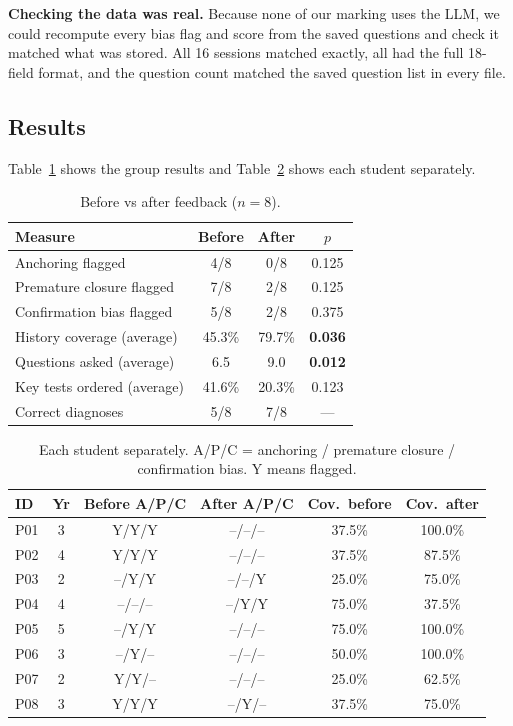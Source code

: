 \documentclass[conference]{IEEEtran}
\begin{document}
\textbf{Checking the data was real.} Because none of our marking uses the LLM,
we could recompute every bias flag and score from the saved questions and check
it matched what was stored. All 16 sessions matched exactly, all had the full
18-field format, and the question count matched the saved question list in every
file.

\subsection{Results}
Table~\ref{tab:pilot} shows the group results and Table~\ref{tab:perpart} shows
each student separately.

\begin{table}[t]
\caption{Before vs after feedback ($n=8$).}
\label{tab:pilot}
\centering
\small
\begin{tabular}{@{}lccc@{}}
\toprule
\textbf{Measure} & \textbf{Before} & \textbf{After} & \textbf{$p$} \\
\midrule
Anchoring flagged            & 4/8    & 0/8    & 0.125 \\
Premature closure flagged    & 7/8    & 2/8    & 0.125 \\
Confirmation bias flagged    & 5/8    & 2/8    & 0.375 \\
History coverage (average)   & 45.3\% & 79.7\% & \textbf{0.036} \\
Questions asked (average)    & 6.5    & 9.0    & \textbf{0.012} \\
Key tests ordered (average)  & 41.6\% & 20.3\% & 0.123 \\
Correct diagnoses            & 5/8    & 7/8    & --- \\
\bottomrule
\end{tabular}
\end{table}

\begin{table}[t]
\caption{Each student separately. A/P/C = anchoring / premature closure /
confirmation bias. Y means flagged.}
\label{tab:perpart}
\centering
\small
\begin{tabular}{@{}lccccc@{}}
\toprule
\textbf{ID} & \textbf{Yr} & \textbf{Before A/P/C} & \textbf{After A/P/C}
& \textbf{Cov.\ before} & \textbf{Cov.\ after} \\
\midrule
P01 & 3 & Y/Y/Y & --/--/-- & 37.5\% & 100.0\% \\
P02 & 4 & Y/Y/Y & --/--/-- & 37.5\% & 87.5\% \\
P03 & 2 & --/Y/Y & --/--/Y & 25.0\% & 75.0\% \\
P04 & 4 & --/--/-- & --/Y/Y & 75.0\% & 37.5\% \\
P05 & 5 & --/Y/Y & --/--/-- & 75.0\% & 100.0\% \\
P06 & 3 & --/Y/-- & --/--/-- & 50.0\% & 100.0\% \\
P07 & 2 & Y/Y/-- & --/--/-- & 25.0\% & 62.5\% \\
P08 & 3 & Y/Y/Y & --/Y/-- & 37.5\% & 75.0\% \\
\bottomrule
\end{tabular}
\end{table}
\end{document}
